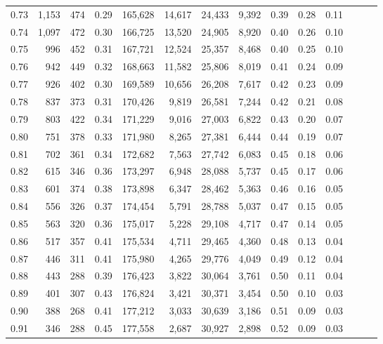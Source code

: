 \begin{tabular}{rrrrrrrrrrrrrr}
0.73 &  1,153 &    474 &  0.29 &  165,628 &   14,617 &  24,433 &   9,392 &  0.39 &  0.28 &      0.11 \\
0.74 &  1,097 &    472 &  0.30 &  166,725 &   13,520 &  24,905 &   8,920 &  0.40 &  0.26 &      0.10 \\
0.75 &    996 &    452 &  0.31 &  167,721 &   12,524 &  25,357 &   8,468 &  0.40 &  0.25 &      0.10 \\
0.76 &    942 &    449 &  0.32 &  168,663 &   11,582 &  25,806 &   8,019 &  0.41 &  0.24 &      0.09 \\
0.77 &    926 &    402 &  0.30 &  169,589 &   10,656 &  26,208 &   7,617 &  0.42 &  0.23 &      0.09 \\
0.78 &    837 &    373 &  0.31 &  170,426 &    9,819 &  26,581 &   7,244 &  0.42 &  0.21 &      0.08 \\
0.79 &    803 &    422 &  0.34 &  171,229 &    9,016 &  27,003 &   6,822 &  0.43 &  0.20 &      0.07 \\
0.80 &    751 &    378 &  0.33 &  171,980 &    8,265 &  27,381 &   6,444 &  0.44 &  0.19 &      0.07 \\
0.81 &    702 &    361 &  0.34 &  172,682 &    7,563 &  27,742 &   6,083 &  0.45 &  0.18 &      0.06 \\
0.82 &    615 &    346 &  0.36 &  173,297 &    6,948 &  28,088 &   5,737 &  0.45 &  0.17 &      0.06 \\
0.83 &    601 &    374 &  0.38 &  173,898 &    6,347 &  28,462 &   5,363 &  0.46 &  0.16 &      0.05 \\
0.84 &    556 &    326 &  0.37 &  174,454 &    5,791 &  28,788 &   5,037 &  0.47 &  0.15 &      0.05 \\
0.85 &    563 &    320 &  0.36 &  175,017 &    5,228 &  29,108 &   4,717 &  0.47 &  0.14 &      0.05 \\
0.86 &    517 &    357 &  0.41 &  175,534 &    4,711 &  29,465 &   4,360 &  0.48 &  0.13 &      0.04 \\
0.87 &    446 &    311 &  0.41 &  175,980 &    4,265 &  29,776 &   4,049 &  0.49 &  0.12 &      0.04 \\
0.88 &    443 &    288 &  0.39 &  176,423 &    3,822 &  30,064 &   3,761 &  0.50 &  0.11 &      0.04 \\
0.89 &    401 &    307 &  0.43 &  176,824 &    3,421 &  30,371 &   3,454 &  0.50 &  0.10 &      0.03 \\
0.90 &    388 &    268 &  0.41 &  177,212 &    3,033 &  30,639 &   3,186 &  0.51 &  0.09 &      0.03 \\
0.91 &    346 &    288 &  0.45 &  177,558 &    2,687 &  30,927 &   2,898 &  0.52 &  0.09 &      0.03 \\

\end{tabular}
